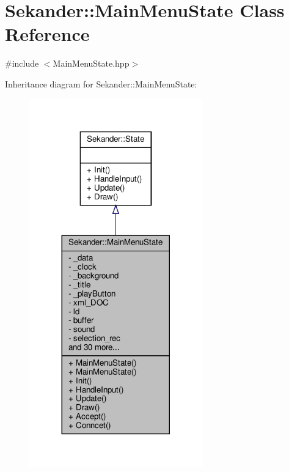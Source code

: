 \hypertarget{classSekander_1_1MainMenuState}{}\section{Sekander\+:\+:Main\+Menu\+State Class Reference}
\label{classSekander_1_1MainMenuState}


{\ttfamily \#include $<$Main\+Menu\+State.\+hpp$>$}



Inheritance diagram for Sekander\+:\+:Main\+Menu\+State\+:
\nopagebreak
\begin{figure}[H]
\begin{center}
\leavevmode
\includegraphics[width=212pt]{classSekander_1_1MainMenuState__inherit__graph}
\end{center}
\end{figure}


